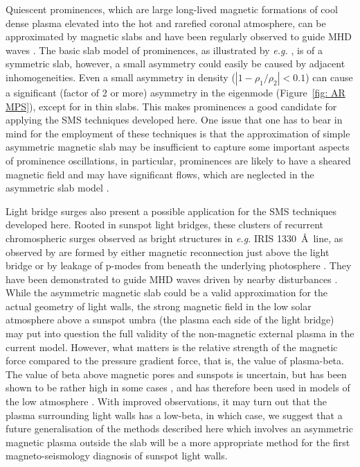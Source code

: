 \documentclass[12pt]{../style-files/ociamthesis}
\begin{document}
Quiescent prominences, which are large long-lived magnetic formations of cool dense plasma elevated into the hot and rarefied coronal atmosphere, can be approximated by magnetic slabs and have been regularly observed to guide MHD waves \citep{arr_etal12}. The basic slab model of prominences, as illustrated by \textit{e.g.} \cite{joa_etal92a,joa_etal92b}, is of a symmetric slab, however, a small asymmetry could easily be caused by adjacent inhomogeneities. Even a small asymmetry in density ($|1 - \rho_1/\rho_2| < 0.1$) can cause a significant (factor of 2 or more) asymmetry in the eigenmode (Figure~\ref{fig: AR MPS}), except for in thin slabs. This makes prominences a good candidate for applying the SMS techniques developed here. One issue that one has to bear in mind for the employment of these techniques is that the approximation of simple asymmetric magnetic slab may be insufficient to capture some important aspects of prominence oscillations, in particular, prominences are likely to have a sheared magnetic field and may have significant flows, which are neglected in the asymmetric slab model \citep{van_etal89,zir_etal94,bal05,oli09,arr_etal12}.

Light bridge surges also present a possible application for the SMS techniques developed here. Rooted in sunspot light bridges, these clusters of recurrent chromospheric surges observed as bright structures in \textit{e.g.} IRIS 1330~\AA~line, as observed by \citealt{yan_etal16} are formed by either magnetic reconnection just above the light bridge \citep{tor_etal15,rob_etal16} or by leakage of p-modes from beneath the underlying photosphere \citep{yan_etal15,zha_etal17}. They have been demonstrated to guide MHD waves driven by nearby disturbances \citep{yan_etal16,yan_etal17}. While the asymmetric magnetic slab could be a valid approximation for the actual geometry of light walls, the strong magnetic field in the low solar atmosphere above a sunspot umbra (the plasma each side of the light bridge) may put into question the full validity of the non-magnetic external plasma in the current model. However, what matters is the relative strength of the magnetic force compared to the pressure gradient force, that is, the value of plasma-beta. The value of beta above magnetic pores and sunspots is uncertain, but has been shown to be rather high in some cases \citep{bou17}, and has therefore been used in models of the low atmosphere \citep{mum_etal15}. With improved observations, it may turn out that the plasma surrounding light walls has a low-beta, in which case, we suggest that a future generalisation of the methods described here which involves an asymmetric magnetic plasma outside the slab will be a more appropriate method for the first magneto-seismology diagnosis of sunspot light walls.
\end{document}
